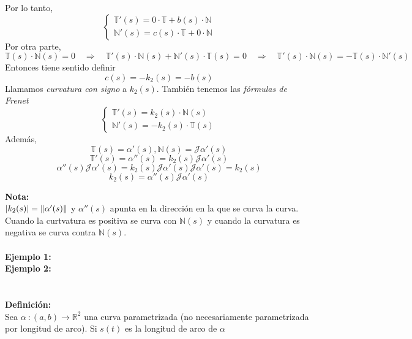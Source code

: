 \documentclass{article}
\begin{document}
Por lo tanto,
$$
\left\{\begin{array}{l}
    \mathbb{T}'(s)=0\cdot\mathbb{T}+b(s)\cdot\mathbb{N}\\
    \mathbb{N}'(s)=c(s)\cdot\mathbb{T}+0\cdot\mathbb{N}
\end{array}\right.
$$
Por otra parte,
$$
\mathbb{T}(s)\cdot\mathbb{N}(s)=0\quad\Rightarrow\quad\mathbb{T}'(s)\cdot\mathbb{N}(s)+\mathbb{N}'(s)\cdot\mathbb{T}(s)=0\quad\Rightarrow\quad\mathbb{T}'(s)\cdot\mathbb{N}(s)=-\mathbb{T}(s)\cdot\mathbb{N}'(s)
$$
Entonces tiene sentido definir
$$
c(s)=-k_2(s)=-b(s)
$$
Llamamos \textit{curvatura con signo} a $k_2(s)$. También tenemos las \textit{fórmulas de Frenet}
$$
\left\{\begin{array}{l}
    \mathbb{T}'(s)=k_2(s)\cdot\mathbb{N}(s)\\
    \mathbb{N}'(s)=-k_2(s)\cdot\mathbb{T}(s)
\end{array}\right.
$$
Además,
$$
\mathbb{T}(s)=\alpha'(s),
\mathbb{N}(s)=\mathcal{J}\alpha'(s)
$$
$$
\mathbb{T}'(s)=\alpha''(s)=k_2(s)\mathcal{J}\alpha'(s)
$$
$$
\alpha''(s)\mathcal{J}\alpha'(s)=k_2(s)\mathcal{J}\alpha'(s)\mathcal{J}\alpha'(s)=k_2(s)
$$
$$
k_2(s)=\alpha''(s)\mathcal{J}\alpha'(s)
$$\newpage

\textbf{Nota:}\\
$|k_2(s)|=\left\|\alpha'(s)\right\|$ y $\alpha''(s)$ apunta en la dirección en la que se curva la curva. Cuando la curtvatura es positiva se curva con $\mathbb{N}(s)$ y cuando la curvatura es negativa se curva contra $\mathbb{N}(s)$.\\\\


\textbf{Ejemplo 1:}\\
\textbf{Ejemplo 2:}\\
\\\\


\textbf{Definición:}\\
Sea $\alpha\::(a,b)\longrightarrow\mathbb{R}^2$ una curva parametrizada (no necesariamente parametrizada por longitud de arco). Si $s(t)$ es la longitud de arco de $\alpha$
\end{document}

